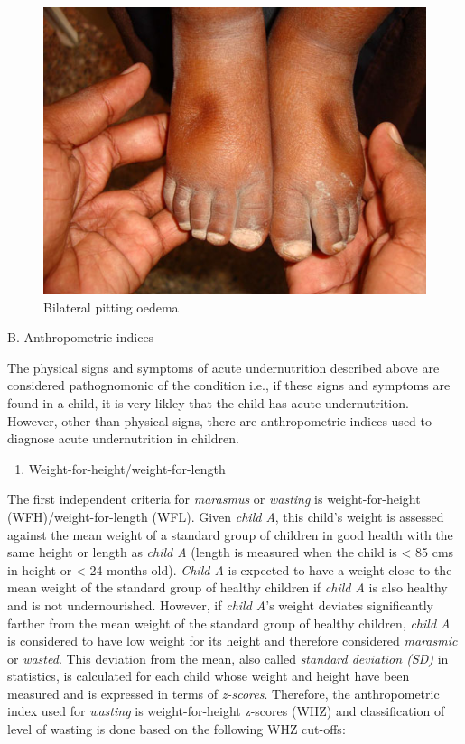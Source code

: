\documentclass[12pt,]{book}
\providecommand{\tightlist}{%
  \setlength{\itemsep}{0pt}\setlength{\parskip}{0pt}}
\theoremstyle{definition}
\theoremstyle{definition}
\theoremstyle{definition}
\theoremstyle{remark}
\begin{document}
\begin{figure}

{\centering \includegraphics[width=6.94in]{images/oedema02} 

}

\caption{Bilateral pitting oedema}\label{fig:unnamed-chunk-1}
\end{figure}

B. Anthropometric indices

The physical signs and symptoms of acute undernutrition described above
are considered pathognomonic of the condition i.e., if these signs and
symptoms are found in a child, it is very likley that the child has
acute undernutrition. However, other than physical signs, there are
anthropometric indices used to diagnose acute undernutrition in
children.

\begin{enumerate}
\def\labelenumi{\arabic{enumi}.}
\tightlist
\item
  Weight-for-height/weight-for-length
\end{enumerate}

The first independent criteria for \emph{marasmus} or \emph{wasting} is
weight-for-height (WFH)/weight-for-length (WFL). Given \emph{child A},
this child's weight is assessed against the mean weight of a standard
group of children in good health with the same height or length as
\emph{child A} (length is measured when the child is \textless{} 85 cms
in height or \textless{} 24 months old). \emph{Child A} is expected to
have a weight close to the mean weight of the standard group of healthy
children if \emph{child A} is also healthy and is not undernourished.
However, if \emph{child A}'s weight deviates significantly farther from
the mean weight of the standard group of healthy children, \emph{child
A} is considered to have low weight for its height and therefore
considered \emph{marasmic} or \emph{wasted}. This deviation from the
mean, also called \emph{standard deviation (SD)} in statistics, is
calculated for each child whose weight and height have been measured and
is expressed in terms of \emph{z-scores}. Therefore, the anthropometric
index used for \emph{wasting} is weight-for-height z-scores (WHZ) and
classification of level of wasting is done based on the following WHZ
cut-offs:
\end{document}
